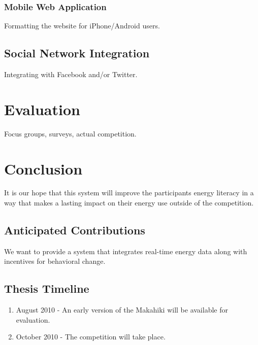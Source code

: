 \subsection{Mobile Web Application}

Formatting the website for iPhone/Android users.

\section{Social Network Integration}
\label{socialint}

Integrating with Facebook and/or Twitter.


\chapter{Evaluation}
\label{evaluation}

Focus groups, surveys, actual competition.

\chapter{Conclusion}
\label{conclusion}

It is our hope that this system will improve the participants energy literacy in a way that makes a lasting impact on their energy use outside of the competition.

\section{Anticipated Contributions}

We want to provide a system that integrates real-time energy data along with incentives for behavioral change.

\section{Thesis Timeline}

\begin{enumerate}
\item August 2010 - An early version of the Makahiki will be available for evaluation.
\item October 2010 - The competition will take place.
\end{enumerate}
